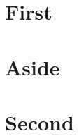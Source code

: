 \documentclass{article}
\begin{document}
\section{First}
\section*{Aside}
\section{Second}
\end{document}
